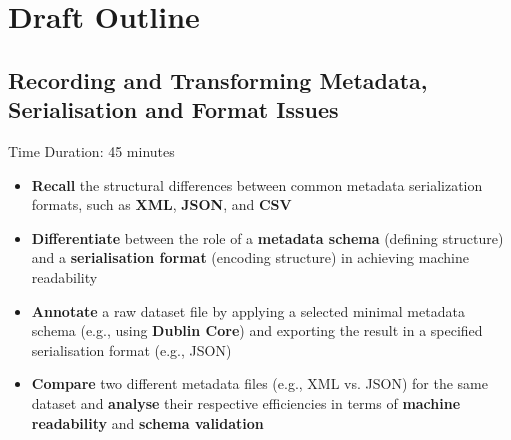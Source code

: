 \documentclass[11pt]{tibop-article}
\begin{document}
\maketitle



\section{Draft Outline}
\subsection{Recording and Transforming Metadata, Serialisation and Format Issues}
Time Duration: 45 minutes

\begin{itemize}
        \item \textbf{Recall} the structural differences between common metadata serialization formats, such as \textbf{XML}, \textbf{JSON}, and \textbf{CSV}
        \item \textbf{Differentiate} between the role of a \textbf{metadata schema} (defining structure) and a \textbf{serialisation format} (encoding structure) in achieving machine readability
        \item \textbf{Annotate} a raw dataset file by applying a selected minimal metadata schema (e.g., using \textbf{Dublin Core}) and exporting the result in a specified serialisation format (e.g., JSON)
    \item \textbf{Compare} two different metadata files (e.g., XML vs. JSON) for the same dataset and \textbf{analyse} their respective efficiencies in terms of \textbf{machine readability} and \textbf{schema validation}

\end{itemize}
\end{document}
